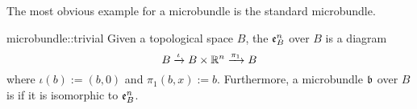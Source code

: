 \begin{myparagraph}
    The most obvious example for a microbundle is the standard microbundle.
\end{myparagraph}

\begin{myexample}{microbundle::trivial}
    Given a topological space $B$, the  $\mathfrak{e}^{n}_{B}$ over $B$ is a diagram
    \[ B \xrightarrow{\iota} B \times \mathbb{R}^n \xrightarrow{\pi_1} B{} \]
    where $\iota(b) := (b, 0)$ and $\pi_1(b, x) := b$.
    Furthermore, a microbundle $\mathfrak{b}$ over $B$ is  if it is isomorphic to $\mathfrak{e}^{n}_{B}$.
\end{myexample}